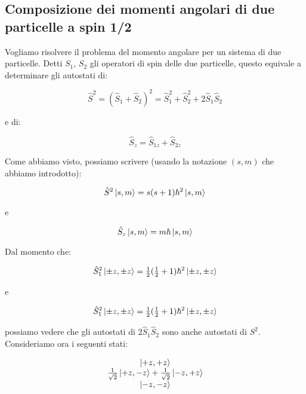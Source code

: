 \subsection{Composizione dei momenti angolari di due particelle a spin 1/2}

Vogliamo risolvere il problema del momento angolare per un sistema di due particelle. Detti $S_1$, $S_2$ gli operatori di spin delle due particelle, questo equivale a determinare gli autostati di:

	\begin{equation}
		\hat{S}^2 = ( \hat{S}_1 + \hat{S}_2 ) ^ 2 = \hat{S}_1^2 + \hat{S}_2^2 + 2 \hat{S}_1 \hat{S}_2
	\end{equation}

e di:

	\begin{equation}
		\hat{S}_z = \hat{S}_{1z} + \hat{S}_{2z}
	\end{equation}

Come abbiamo visto, possiamo scrivere (usando la notazione $(s, m)$ che abbiamo introdotto):

	\begin{equation}
		\hat{S}^2 \ket{s, m} = s(s+1) \hbar^2 \ket{s, m}
	\end{equation}

e

	\begin{equation}
		\hat{S}_z \ket{s, m} = m \hbar \ket{s, m}
	\end{equation}

Dal momento che:

	\begin{equation}
		\hat{S}_1^2 \ket{\pm z, \pm z} = \tfrac{1}{2} ( \tfrac{1}{2} + 1 ) \hbar^2 \ket{\pm z, \pm z}
	\end{equation}

e

	\begin{equation}
		\hat{S}_1^2 \ket{\pm z, \pm z} = \tfrac{1}{2} ( \tfrac{1}{2} + 1 ) \hbar^2 \ket{\pm z, \pm z}
	\end{equation}

possiamo vedere che gli autostati di $2 \hat{S}_1 \hat{S}_2$ sono anche autostati di $S^2$. Consideriamo ora i seguenti stati:

	\begin{equation}
		\begin{array}{c}
			\ket{+z, +z} \\
			\frac{1}{\sqrt{2}} \ket{+z, -z} + \frac{1}{\sqrt{2}} \ket{-z, +z} \\
			\ket{-z, -z} \\
		\end{array}
	\end{equation}

